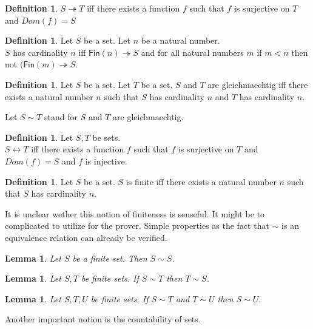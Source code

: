 \documentclass[10pt]{article}
\newenvironment{forthel}{\begin{leftbar}}{\end{leftbar}}
\newcommand{\Fin}{\mathsf{Fin}}
\theoremstyle{definition}
\newtheorem{definition}[theorem]{Definition}
\theoremstyle{plain}
\newtheorem{lemma}[theorem]{Lemma}
\theoremstyle{remark}
\begin{document}
\begin{forthel}
\begin{definition}
		$S \twoheadrightarrow T$ iff there exists a function $f$ such that $f$ is surjective on $T$ and $Dom(f)=S$
	\end{definition}
	\begin{definition}
		Let $S$ be a set. Let $n$ be a natural number. \\
		$S$ has cardinality $n$ iff $\Fin(n) \twoheadrightarrow S$ and for all natural numbers $m$ if $m<n$ then not $(\Fin(m) \twoheadrightarrow S$.
	\end{definition}
	\begin{definition}
		Let $S$ be a set. Let $T$ be a set. $S$ and $T$ are gleichmaechtig iff there exists a natural number $n$ such that $S$ has cardinality $n$ and $T$ has cardinality $n$.
	\end{definition}
	Let $S\sim T$ stand for $S$ and $T$ are gleichmaechtig.
	\begin{definition}
		Let $S,T$ be sets. \\
		$S \leftrightarrow T$ iff there exists a function $f$ such that $f$ is surjective on $T$ and $Dom(f) = S$ and $f$ is injective.
	\end{definition}
	\begin{definition}
		Let $S$ be a set. $S$ is finite iff there exists a natural number $n$ such that $S$ has cardinality $n$.
	\end{definition}
\end{forthel}
It is unclear wether this notion of finiteness is senseful. It might be to complicated to utilize for the prover. Simple properties as the fact that $\sim$ is an equivalence relation can already be verified.
\begin{forthel}
	\begin{lemma}
		Let $S$ be a finite set. Then $S \sim S$.
	\end{lemma}
	\begin{lemma}
		Let $S,T$ be finite sets. If $S\sim T$ then $T\sim S$.
	\end{lemma}
	\begin{lemma}
		Let $S,T,U$ be finite sets. If $S \sim T$ and $T \sim U$ then $S \sim U$.
	\end{lemma}
\end{forthel}
Another important notion is the countability of sets.
\end{document}
